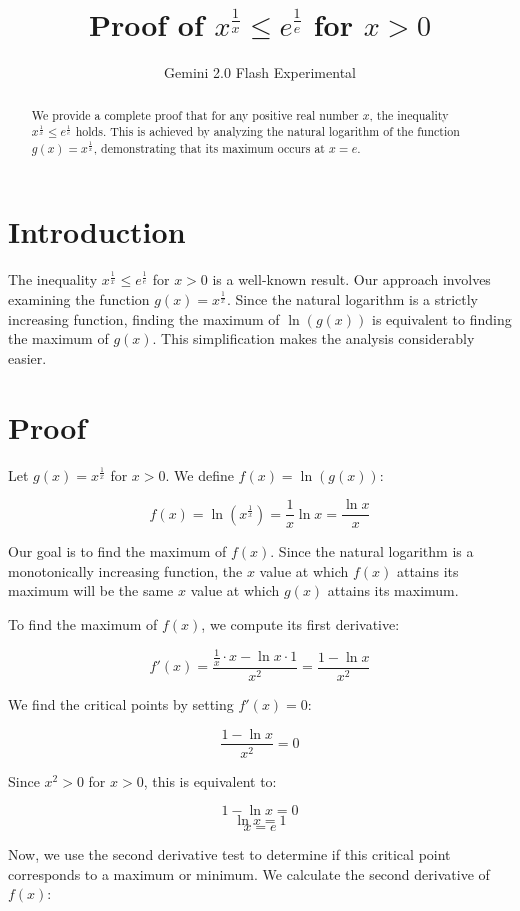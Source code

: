 \documentclass{article}
\title{Proof of $x^{\frac{1}{x}} \leq e^{\frac{1}{e}}$ for $x > 0$}
\author{Gemini 2.0 Flash Experimental}
\begin{document}
	
	\maketitle
	
	\begin{abstract}
		We provide a complete proof that for any positive real number $x$, the inequality $x^{\frac{1}{x}} \leq e^{\frac{1}{e}}$ holds. This is achieved by analyzing the natural logarithm of the function $g(x) = x^{\frac{1}{x}}$, demonstrating that its maximum occurs at $x=e$.
	\end{abstract}
	
	\section{Introduction}
	
	The inequality $x^{\frac{1}{x}} \leq e^{\frac{1}{e}}$ for $x > 0$ is a well-known result. Our approach involves examining the function $g(x) = x^{\frac{1}{x}}$. Since the natural logarithm is a strictly increasing function, finding the maximum of $\ln(g(x))$ is equivalent to finding the maximum of $g(x)$. This simplification makes the analysis considerably easier.
	
	\section{Proof}
	
	Let $g(x) = x^{\frac{1}{x}}$ for $x > 0$. We define $f(x) = \ln(g(x))$:
	
	$$f(x) = \ln(x^{\frac{1}{x}}) = \frac{1}{x} \ln x = \frac{\ln x}{x}$$
	
	Our goal is to find the maximum of $f(x)$. Since the natural logarithm is a monotonically increasing function, the $x$ value at which $f(x)$ attains its maximum will be the same $x$ value at which $g(x)$ attains its maximum.
	
	To find the maximum of $f(x)$, we compute its first derivative:
	
	$$f'(x) = \frac{\frac{1}{x} \cdot x - \ln x \cdot 1}{x^2} = \frac{1 - \ln x}{x^2}$$
	
	We find the critical points by setting $f'(x) = 0$:
	
	$$\frac{1 - \ln x}{x^2} = 0$$
	
	Since $x^2 > 0$ for $x > 0$, this is equivalent to:
	
	$$1 - \ln x = 0$$
	$$\ln x = 1$$
	$$x = e$$
	
	Now, we use the second derivative test to determine if this critical point corresponds to a maximum or minimum. We calculate the second derivative of $f(x)$:
	
\end{document}
